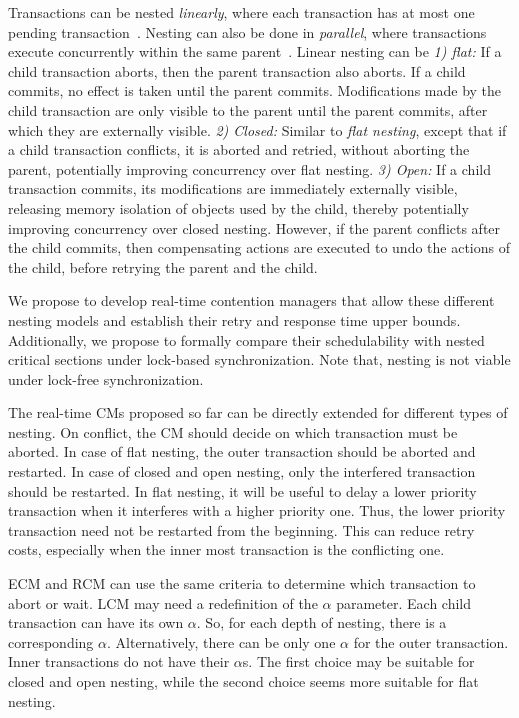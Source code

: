 \documentclass[12pt,english]{report}
\begin{document}
Transactions can be nested \textit{linearly}, where each transaction has at most one pending transaction~\cite{Moss2006186}. Nesting can also be done in \textit{parallel}, where transactions execute concurrently within the same parent~\cite{volos2009nepaltm}. Linear nesting can be \textit{1) flat:} If a child transaction aborts, then the parent transaction also aborts. If a child commits, no effect is taken until the parent commits. Modifications made by the child transaction are only visible to the parent until the parent commits, after which they are externally visible. 
%
\textit{2) Closed:} Similar to \textit{flat nesting}, except that if a child transaction conflicts, it is aborted and retried, without aborting the parent, potentially improving concurrency over flat nesting. 
%
\textit{3) Open:} If a child transaction commits, its modifications are immediately externally visible, releasing memory isolation  of objects used by the child, thereby potentially improving concurrency over closed nesting. However, if the parent conflicts after the child commits, then compensating actions are executed to undo the actions of the child, before retrying the parent and the child. 


We propose to develop real-time contention managers that allow these different nesting models and establish their retry and response time upper bounds. Additionally, we propose to formally compare their schedulability with nested critical sections under lock-based synchronization. Note that, nesting is not viable under lock-free synchronization.


The real-time CMs proposed so far can be directly extended for different types of nesting. On conflict, the CM should decide on which transaction must be  aborted. In case of flat nesting, the outer transaction should be aborted and restarted. In case of closed and open nesting, only the interfered transaction should be restarted. In flat nesting, it will be useful to delay a lower priority transaction when it interferes with a higher priority one. Thus, the lower priority transaction need not be restarted from the beginning. This can reduce retry costs, especially when the inner most transaction is the conflicting one.


ECM and RCM can use the same criteria to determine which transaction to abort or wait. LCM may need a redefinition of the $\alpha$ parameter. Each child transaction can have its own $\alpha$. So, for each depth of nesting, there is a corresponding $\alpha$. Alternatively, there can be only one $\alpha$ for the outer transaction. Inner transactions do not have their $\alpha$s. The first choice may be suitable for closed and open nesting, while the second choice seems more suitable for flat nesting. 
\end{document}
